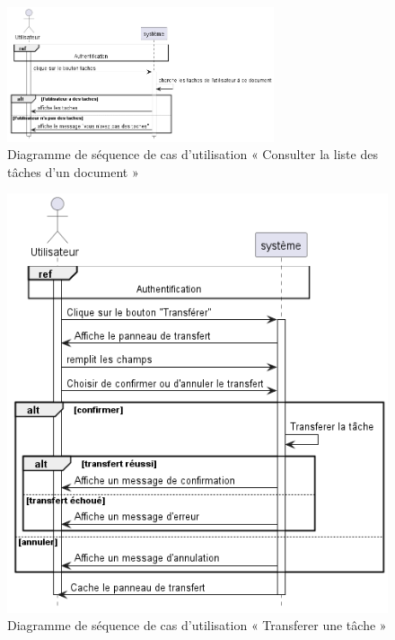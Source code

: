 \begin{figure}[H]
  \centering
  \includegraphics[width=0.7\textwidth]{out/diagrams/documents/previewTasks/preview_tasks_document}
  \caption{Diagramme de séquence de cas d'utilisation « Consulter la liste des tâches d'un document  »}
  \label{fig:sequence_previewTasks}
\end{figure}
\begin{figure}[H]
  \centering
  \includegraphics[width=1\textwidth]{out/diagrams/documents/transfer_task/transfer_task}
  \caption{Diagramme de séquence de cas d'utilisation « Transferer une tâche  »}
  \label{fig:sequence_transfer_task}
\end{figure}
